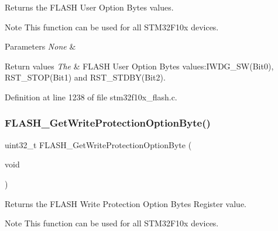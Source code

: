 Returns the F\+L\+A\+SH User Option Bytes values. 

\begin{DoxyNote}{Note}
This function can be used for all S\+T\+M32\+F10x devices. 
\end{DoxyNote}

\begin{DoxyParams}{Parameters}
{\em None} & \\
\hline
\end{DoxyParams}

\begin{DoxyRetVals}{Return values}
{\em The} & F\+L\+A\+SH User Option Bytes values\+:I\+W\+D\+G\+\_\+\+S\+W(\+Bit0), R\+S\+T\+\_\+\+S\+T\+O\+P(\+Bit1) and R\+S\+T\+\_\+\+S\+T\+D\+B\+Y(\+Bit2). \\
\hline
\end{DoxyRetVals}


Definition at line 1238 of file stm32f10x\+\_\+flash.\+c.

\mbox{\label{group___f_l_a_s_h___exported___functions_gac009e061562c7d36d7d2d00bb1c8aafa}} 
\subsubsection{\texorpdfstring{F\+L\+A\+S\+H\+\_\+\+Get\+Write\+Protection\+Option\+Byte()}{FLASH\_GetWriteProtectionOptionByte()}}
{\footnotesize\ttfamily uint32\+\_\+t F\+L\+A\+S\+H\+\_\+\+Get\+Write\+Protection\+Option\+Byte (\begin{DoxyParamCaption}\item[{void}]{ }\end{DoxyParamCaption})}



Returns the F\+L\+A\+SH Write Protection Option Bytes Register value. 

\begin{DoxyNote}{Note}
This function can be used for all S\+T\+M32\+F10x devices. 
\end{DoxyNote}

